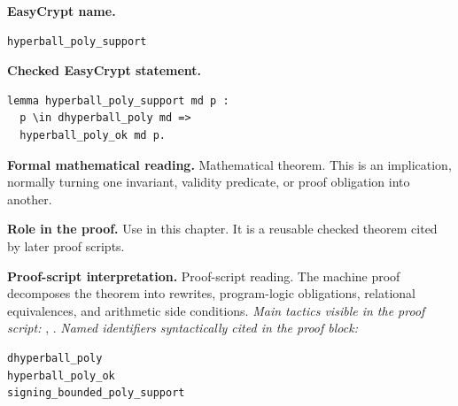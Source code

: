 \begin{formaltheorem}
\noindent\textbf{EasyCrypt name.}
\begin{lstlisting}[language=EasyCrypt,basicstyle=\ttfamily\scriptsize]
hyperball_poly_support
\end{lstlisting}
\noindent\textbf{Checked EasyCrypt statement.}
\begin{lstlisting}[language=EasyCrypt,basicstyle=\ttfamily\scriptsize]
lemma hyperball_poly_support md p :
  p \in dhyperball_poly md =>
  hyperball_poly_ok md p.
\end{lstlisting}
\noindent\textbf{Formal mathematical reading.}
Mathematical theorem. This is an implication, normally turning one invariant, validity predicate, or proof obligation into another.

\noindent\textbf{Role in the proof.}
Use in this chapter. It is a reusable checked theorem cited by later proof scripts.

\noindent\textbf{Proof-script interpretation.}
Proof-script reading. The machine proof decomposes the theorem into rewrites, program-logic obligations, relational equivalences, and arithmetic side conditions.
\emph{Main tactics visible in the proof script:} , .
\emph{Named identifiers syntactically cited in the proof block:}
\begin{lstlisting}[language=EasyCrypt,basicstyle=\ttfamily\scriptsize]
dhyperball_poly
hyperball_poly_ok
signing_bounded_poly_support
\end{lstlisting}

\end{formaltheorem}

